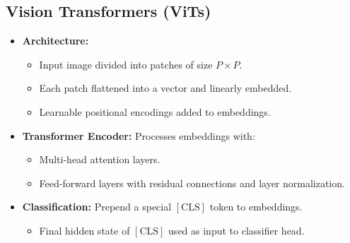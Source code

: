\documentclass[12pt,a4paper]{article}
\begin{document}
\subsection{Vision Transformers (ViTs)}
\begin{itemize}
    \item \textbf{Architecture:}
    \begin{itemize}
        \item Input image divided into patches of size $P \times P$.
        \item Each patch flattened into a vector and linearly embedded.
        \item Learnable positional encodings added to embeddings.
    \end{itemize}
    \item \textbf{Transformer Encoder:} Processes embeddings with:
    \begin{itemize}
        \item Multi-head attention layers.
        \item Feed-forward layers with residual connections and layer normalization.
    \end{itemize}
    \item \textbf{Classification:} Prepend a special $[\text{CLS}]$ token to embeddings.
    \begin{itemize}
        \item Final hidden state of $[\text{CLS}]$ used as input to classifier head.
    \end{itemize}
\end{itemize}
\end{document}
